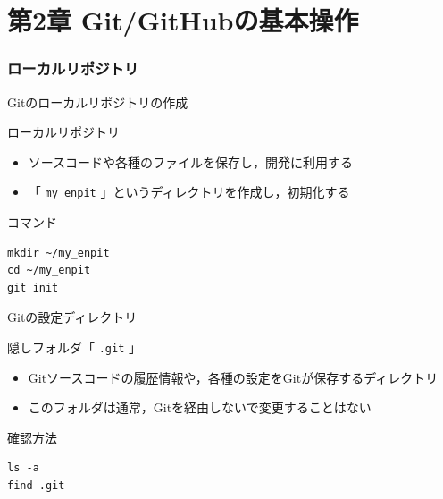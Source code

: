 \documentclass[t, aspectratio=169]{beamer}
\begin{document}
\part{第2章 Git/GitHubの基本操作}
\label{sec-2}
\section{ローカルリポジトリ}
\label{sec-2-1}
\begin{frame}[fragile,label=sec-2-1-1]{Gitのローカルリポジトリの作成}
 \begin{block}{ローカルリポジトリ}
\begin{itemize}
\item ソースコードや各種のファイルを保存し，開発に利用する
\item 「 \texttt{my\_enpit} 」というディレクトリを作成し，初期化する
\end{itemize}
\end{block}
\begin{block}{コマンド}
\begin{verbatim}
mkdir ~/my_enpit
cd ~/my_enpit
git init
\end{verbatim}
\end{block}
\end{frame}

\begin{frame}[fragile,label=sec-2-1-2]{Gitの設定ディレクトリ}
 \begin{block}{隠しフォルダ「 \texttt{.git} 」}
\begin{itemize}
\item Gitソースコードの履歴情報や，各種の設定をGitが保存するディレクトリ
\item このフォルダは通常，Gitを経由しないで変更することはない
\end{itemize}
\end{block}
\begin{block}{確認方法}
\begin{verbatim}
ls -a
find .git
\end{verbatim}
\end{block}
\end{frame}
\end{document}
